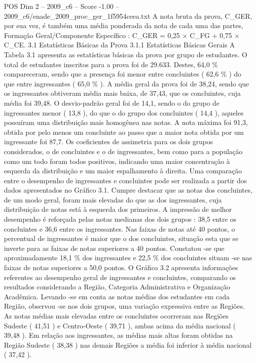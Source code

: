 \begin{textsample}{POS Dim 2 – 2009\_c6 – Score -1.00 – 2009\_c6/enade\_2009\_proc\_ger\_1f5954ceea.txt}
A nota bruta da prova, C\_GER, por sua vez, é também uma média ponderada da nota de cada uma das partes, Formação Geral/Componente Específico : C\_GER = 0,25 × C\_FG + 0,75 × C\_CE. 3.1 Estatísticas Básicas da Prova 3.1.1 Estatísticas Básicas Gerais A Tabela 3.1 apresenta as estatísticas básicas da prova por grupo de estudantes.
O total de estudantes inscritos para a prova foi de 29.633.
Destes, 64,0 \% compareceram, sendo que a presença foi menor entre concluintes ( 62,6 \% ) do que entre ingressantes ( 65,0 \% ).
A média geral da prova foi de 38,24, sendo que os ingressantes obtiveram média mais baixa, de 37,43, que os concluintes, cuja média foi 39,48.
O desvio-padrão geral foi de 14,1, sendo o do grupo de ingressantes menor ( 13,8 ), do que o do grupo dos concluintes ( 14,4 ), aqueles possuíram uma distribuição mais homogênea nas notas.
A nota máxima foi 91,3, obtida por pelo menos um concluinte ao passo que a maior nota obtida por um ingressante foi 87,7.
Os coeficientes de assimetria para os dois grupos considerados, o de concluintes e o de ingressantes, bem como para a população como um todo foram todos positivos, indicando uma maior concentração à esquerda da distribuição e um maior espalhamento à direita.
Uma comparação entre o desempenho de ingressantes e concluintes pode ser realizada a partir dos dados apresentados no Gráfico 3.1.
Cumpre destacar que as notas dos concluintes, de um modo geral, foram mais elevadas do que as dos ingressantes, cuja distribuição de notas está à esquerda dos primeiros.
A impressão de melhor desempenho é reforçada pelas notas medianas dos dois grupos : 38,5 entre os concluintes e 36,6 entre os ingressantes.
Nas faixas de notas até 40 pontos, o percentual de ingressantes é maior que o dos concluintes, situação esta que se inverte para as faixas de notas superiores a 40 pontos.
Constatou -se que aproximadamente 18,1 \% dos ingressantes e 22,5 \% dos concluintes situam -se nas faixas de notas superiores a 50,0 pontos.
O Gráfico 3.2 apresenta informações referentes ao desempenho geral de ingressantes e concluintes, comparando os resultados considerando a Região, Categoria Administrativa e Organização Acadêmica.
Levando -se em conta as notas médias dos estudantes em cada Região, observou -se nos dois grupos, uma variação expressiva entre as Regiões.
As notas médias mais elevadas entre os concluintes ocorreram nas Regiões Sudeste ( 41,51 ) e Centro-Oeste ( 39,71 ), ambas acima da média nacional ( 39,48 ).
Em relação aos ingressantes, as médias mais altas foram obtidas na Região Sudeste ( 38,38 ) nas demais Regiões a média foi inferior à média nacional ( 37,42 ).

\end{textsample}
